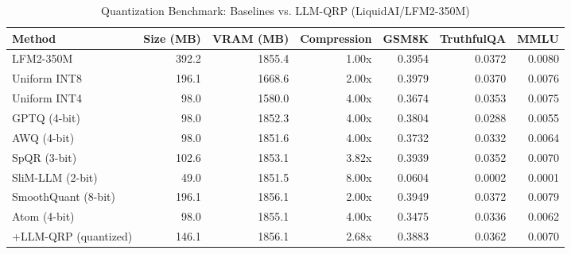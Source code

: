 \begin{table}[htbp]
  \centering
  \small
  \caption{Quantization Benchmark: Baselines vs. LLM-QRP (LiquidAI/LFM2-350M)}
  \label{tab:benchmark}
  \begin{tabular}{lrrrrrr}
    \toprule
    \textbf{Method} & \textbf{Size (MB)} & \textbf{VRAM (MB)} & \textbf{Compression} & \textbf{GSM8K} & \textbf{TruthfulQA} & \textbf{MMLU} \\
    \midrule
    LFM2-350M & 392.2 & 1855.4 & 1.00x & 0.3954 & 0.0372 & 0.0080 \\
    Uniform INT8 & 196.1 & 1668.6 & 2.00x & 0.3979 & 0.0370 & 0.0076 \\
    Uniform INT4 & 98.0 & 1580.0 & 4.00x & 0.3674 & 0.0353 & 0.0075 \\
    GPTQ (4-bit) & 98.0 & 1852.3 & 4.00x & 0.3804 & 0.0288 & 0.0055 \\
    AWQ (4-bit) & 98.0 & 1851.6 & 4.00x & 0.3732 & 0.0332 & 0.0064 \\
    SpQR (3-bit) & 102.6 & 1853.1 & 3.82x & 0.3939 & 0.0352 & 0.0070 \\
    SliM-LLM (2-bit) & 49.0 & 1851.5 & 8.00x & 0.0604 & 0.0002 & 0.0001 \\
    SmoothQuant (8-bit) & 196.1 & 1856.1 & 2.00x & 0.3949 & 0.0372 & 0.0079 \\
    Atom (4-bit) & 98.0 & 1855.1 & 4.00x & 0.3475 & 0.0336 & 0.0062 \\
    \midrule
    +LLM-QRP (quantized) & 146.1 & 1856.1 & 2.68x & 0.3883 & 0.0362 & 0.0070 \\
    \bottomrule
  \end{tabular}
\end{table}
